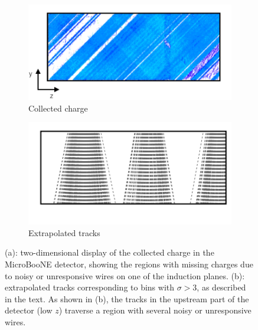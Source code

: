 \documentclass[a4paper,11pt]{article}
\begin{document}
\begin{figure}[htbp]
  \begin{center}
    \begin{subfigure}{0.48\textwidth}
      \includegraphics[width=\linewidth]{figures/chargecoll.png}
      \caption{Collected charge}
    \end{subfigure}
    \begin{subfigure}{0.48\textwidth}
      \includegraphics[width=\linewidth]{figures/extrtracks.png}
      \caption{Extrapolated tracks}
    \end{subfigure}

    \caption{(a): two-dimensional display of the collected charge in the MicroBooNE detector, showing the regions with missing charges due to noisy or unresponsive wires on one of the induction planes. (b): extrapolated tracks corresponding to bins with $\sigma>3$, as described in the text. As shown in (b), the tracks in the upstream part of the detector (low $z$) traverse a region with several noisy or unresponsive wires.} \label{fig:wires}
  \end{center}
\end{figure}
\end{document}
